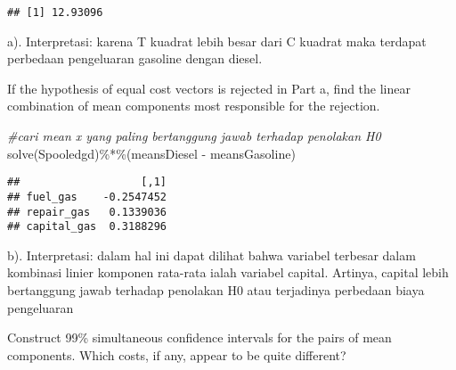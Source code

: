 \documentclass[
]{article}
\newenvironment{Shaded}{\begin{snugshade}}{\end{snugshade}}
\newcommand{\CommentTok}[1]{\textcolor[rgb]{0.56,0.35,0.01}{\textit{#1}}}
\newcommand{\FunctionTok}[1]{\textcolor[rgb]{0.00,0.00,0.00}{#1}}
\newcommand{\NormalTok}[1]{#1}
\newcommand{\SpecialCharTok}[1]{\textcolor[rgb]{0.00,0.00,0.00}{#1}}
\begin{document}
\begin{verbatim}
## [1] 12.93096
\end{verbatim}

a). Interpretasi: karena T kuadrat lebih besar dari C kuadrat maka
terdapat perbedaan pengeluaran gasoline dengan diesel.

If the hypothesis of equal cost vectors is rejected in Part a, find the
linear combination of mean components most responsible for the
rejection.

\begin{Shaded}
\begin{Highlighting}[]
\CommentTok{\#cari mean x yang paling bertanggung jawab terhadap penolakan H0}
\FunctionTok{solve}\NormalTok{(Spooledgd)}\SpecialCharTok{\%*\%}\NormalTok{(meansDiesel }\SpecialCharTok{{-}}\NormalTok{ meansGasoline)}
\end{Highlighting}
\end{Shaded}

\begin{verbatim}
##                   [,1]
## fuel_gas    -0.2547452
## repair_gas   0.1339036
## capital_gas  0.3188296
\end{verbatim}

b). Interpretasi: dalam hal ini dapat dilihat bahwa variabel terbesar
dalam kombinasi linier komponen rata-rata ialah variabel capital.
Artinya, capital lebih bertanggung jawab terhadap penolakan H0 atau
terjadinya perbedaan biaya pengeluaran

Construct 99\% simultaneous confidence intervals for the pairs of mean
components. Which costs, if any, appear to be quite different?
\end{document}
